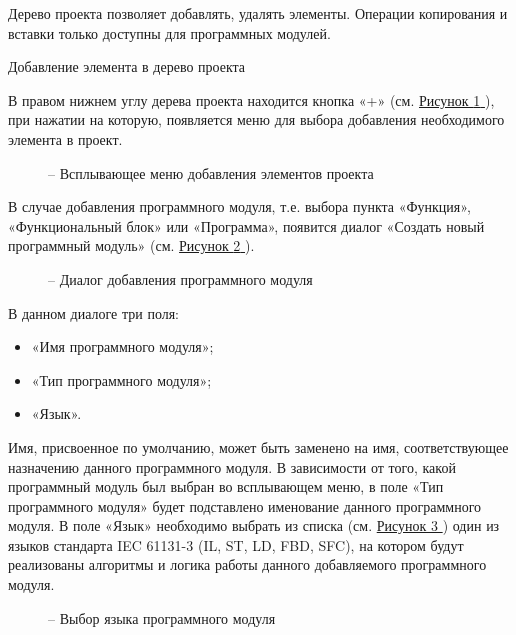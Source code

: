 \documentclass[letterpaper,10pt,russian]{sphinxmanual}
\begin{document}
Дерево проекта позволяет добавлять, удалять элементы. Операции
копирования и вставки только доступны для программных модулей.

Добавление элемента в дерево проекта

В правом нижнем углу дерева проекта находится кнопка «+» (см. \hyperref[usage_guide/ide_components:image24]{Рисунок \ref{usage_guide/ide_components:image24} }),
при нажатии на которую, появляется меню для выбора добавления
необходимого элемента в проект.
\begin{figure}[htbp]
\centering
\capstart

\noindent{}
\caption{– Всплывающее меню добавления элементов проекта}\label{usage_guide/ide_components:image24}\end{figure}

В случае добавления программного модуля, т.е. выбора пункта «Функция»,
«Функциональный блок» или «Программа», появится диалог «Создать новый
программный модуль» (см. \hyperref[usage_guide/ide_components:image25]{Рисунок \ref{usage_guide/ide_components:image25} }).
\begin{figure}[htbp]
\centering
\capstart

\noindent{}
\caption{– Диалог добавления программного модуля}\label{usage_guide/ide_components:image25}\end{figure}

В данном диалоге три поля:
\begin{itemize}
\item {} 
«Имя программного модуля»;

\item {} 
«Тип программного модуля»;

\item {} 
«Язык».

\end{itemize}

Имя, присвоенное по умолчанию, может быть заменено на имя,
соответствующее назначению данного программного модуля. В зависимости от
того, какой программный модуль был выбран во всплывающем меню, в поле
«Тип программного модуля» будет подставлено именование данного
программного модуля. В поле «Язык» необходимо выбрать из списка (см.
\hyperref[usage_guide/ide_components:image26]{Рисунок \ref{usage_guide/ide_components:image26} }) один из языков стандарта IEC 61131-3 (IL, ST, LD, FBD, SFC), на
котором будут реализованы алгоритмы и логика работы данного добавляемого
программного модуля.
\begin{figure}[htbp]
\centering
\capstart

\noindent{}
\caption{– Выбор языка программного модуля}\label{usage_guide/ide_components:image26}\end{figure}
\end{document}
